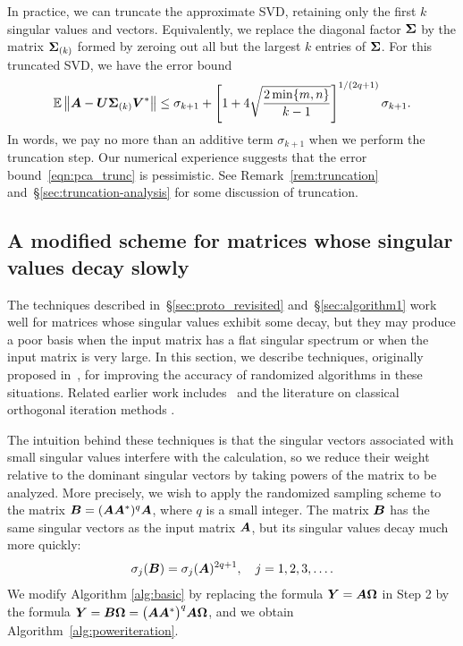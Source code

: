 \documentclass{article}
\begin{document}
In practice, we can truncate the approximate SVD, retaining only the
first $k$ singular values and vectors.  Equivalently, we
replace the diagonal factor $\bm{\Sigma}$ by the matrix
$\bm{\Sigma}_{(k)}$ formed by zeroing out all but the
largest $k$ entries of $\bm{\Sigma}$.  For this truncated SVD, we have the error bound
\begin{equation} \label{eqn:pca_trunc}
\operatorname{\mathbb{E}} \left\Vert { \bm{A} - \bm{U} \bm{\Sigma}_{(k)} \bm{V}^*} \right\Vert
	\leq \sigma_{k+1} + \left[ 1 + 4 \sqrt{\frac{2\min\{m,n\}}{k-1}} \right]^{1/(2q+1)} \sigma_{k+1}.
\end{equation}
In words, we pay no more than an additive term $\sigma_{k+1}$ when we
perform the truncation step.  Our numerical experience suggests that
the error bound~\eqref{eqn:pca_trunc} is pessimistic.
See Remark~\ref{rem:truncation} and~\S\ref{sec:truncation-analysis} for some
discussion of truncation.


\subsection{A modified scheme for matrices whose singular values decay slowly}
\label{sec:powerscheme}

The techniques described in~\S\ref{sec:proto_revisited} and~\S\ref{sec:algorithm1}
work well for matrices whose singular values exhibit some decay,
but they may produce a poor basis when the input matrix has a flat singular spectrum
or when the input matrix is very large. In this section, we describe techniques,
originally proposed in~\cite{Gu-personal,tygert_szlam}, for improving the accuracy
of randomized algorithms in these situations.
Related earlier work includes~\cite{roweis} and the literature on
classical orthogonal iteration methods \cite[p.~332]{golub}.

The intuition behind these techniques is that
the singular vectors associated with small singular values
interfere with the calculation, so we reduce their weight relative to
the dominant singular vectors by taking powers of the matrix to be analyzed.
More precisely, we wish to apply the randomized sampling scheme
to the matrix $\bm{B} = (\bm{A}\bm{A}^*)^q \bm{A}$, where $q$ is a
small integer.  The matrix $\bm{B}$ has the same singular vectors as
the input matrix $\bm{A}$, but its singular values decay much more quickly:
\begin{equation}
\label{eq:svds_of_B}
\sigma_j( \bm{B} ) = \sigma_j( \bm{A} )^{2q+1},
\quad j = 1, 2, 3, \dots.
\end{equation}
We modify Algorithm \ref{alg:basic} by replacing the formula $\bm{Y} = \bm{A}\bm{\Omega}$
in Step 2 by the formula
$\bm{Y} = \bm{B}\bm{\Omega} = \bigl(\bm{A}\bm{A}^{*}\bigr)^{q}\bm{A}\bm{\Omega}$,
and we obtain Algorithm~\ref{alg:poweriteration}.
\end{document}
